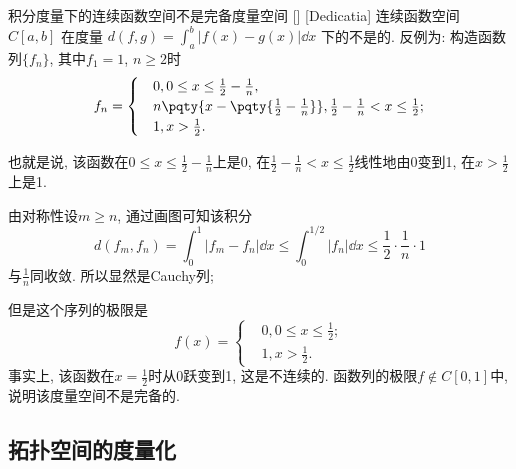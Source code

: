 \documentclass[UTF8]{ctexart}
\begin{document}
            \begin{cxmp}
                []
                {积分度量下的连续函数空间不是完备度量空间}
                []
                [Dedicatia]
                连续函数空间 $C[a,b]$ 在度量 $d(f,g)=\int_{a}^b|f(x)-g(x)|\dd{x}$ 下的 不是 的. 反例为: 构造函数列$\{f_n\}$, 其中$f_1=1$, $n\geq 2$时
                \[f_n=\begin{cases}
                    &0, 0\leq x\leq \frac{1}{2}-\frac{1}{n},\\
                    &n\pqty{x-\pqty{\frac{1}{2}-\frac{1}{n}}}, \frac{1}{2}-\frac{1}{n}< x\leq \frac{1}{2};\\
                    &1, x>\frac{1}{2}.
                \end{cases}\]
                
                也就是说, 该函数在$0\leq x\leq \frac{1}{2}-\frac{1}{n}$上是0, 在$\frac{1}{2}-\frac{1}{n}< x\leq \frac{1}{2}$线性地由0变到1, 在$x>\frac{1}{2}$上是1.
                
                由对称性设$m\geq n$, 通过画图可知该积分
                \[d(f_m,f_n)=\int_0^1|f_m-f_n|\dd{x}\leq\int_0^{1/2}|f_n|\dd{x}\leq\frac{1}{2}\cdot\frac{1}{n}\cdot 1\]
                与$\frac{1}{n}$同收敛. 所以显然是Cauchy列; 
                
                但是这个序列的极限是
                \[f(x)=\begin{cases}
                    &0, 0\leq x\leq\frac{1}{2};\\
                    &1, x>\frac{1}{2}.
                \end{cases}\]
                事实上, 该函数在$x=\frac{1}{2}$时从0跃变到1, 这是不连续的. 函数列的极限$f\notin C[0,1]$中, 说明该度量空间不是完备的. 
            \end{cxmp}

        \subsection{拓扑空间的度量化}
            
            \begin{thm}
                {}
            \end{thm}
\end{document}
